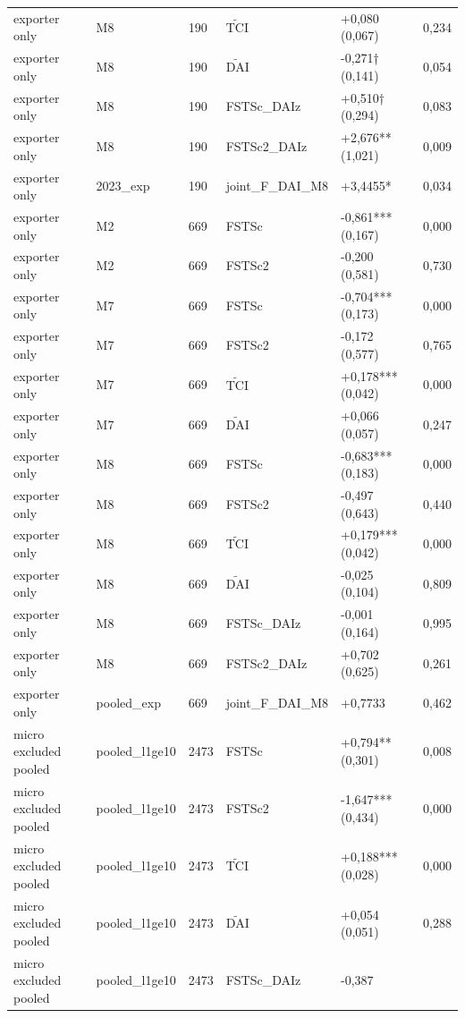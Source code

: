 \documentclass[12pt,a4paper]{article}
\begin{document}
\begin{longtable}[]{@{}llllll@{}}
exporter only & M8 & 190 & \(\tilde{\mathrm{TCI}}\) & +0,080 (0,067) &
0,234 \\
exporter only & M8 & 190 & \(\tilde{\mathrm{DAI}}\) & -0,271† (0,141) &
0,054 \\
exporter only & M8 & 190 & FSTSc\_DAIz & +0,510† (0,294) & 0,083 \\
exporter only & M8 & 190 & FSTSc2\_DAIz & +2,676** (1,021) & 0,009 \\
exporter only & 2023\_exp & 190 & joint\_F\_DAI\_M8 & +3,4455* &
0,034 \\
exporter only & M2 & 669 & FSTSc & -0,861*** (0,167) & 0,000 \\
exporter only & M2 & 669 & FSTSc2 & -0,200 (0,581) & 0,730 \\
exporter only & M7 & 669 & FSTSc & -0,704*** (0,173) & 0,000 \\
exporter only & M7 & 669 & FSTSc2 & -0,172 (0,577) & 0,765 \\
exporter only & M7 & 669 & \(\tilde{\mathrm{TCI}}\) & +0,178*** (0,042)
& 0,000 \\
exporter only & M7 & 669 & \(\tilde{\mathrm{DAI}}\) & +0,066 (0,057) &
0,247 \\
exporter only & M8 & 669 & FSTSc & -0,683*** (0,183) & 0,000 \\
exporter only & M8 & 669 & FSTSc2 & -0,497 (0,643) & 0,440 \\
exporter only & M8 & 669 & \(\tilde{\mathrm{TCI}}\) & +0,179*** (0,042)
& 0,000 \\
exporter only & M8 & 669 & \(\tilde{\mathrm{DAI}}\) & -0,025 (0,104) &
0,809 \\
exporter only & M8 & 669 & FSTSc\_DAIz & -0,001 (0,164) & 0,995 \\
exporter only & M8 & 669 & FSTSc2\_DAIz & +0,702 (0,625) & 0,261 \\
exporter only & pooled\_exp & 669 & joint\_F\_DAI\_M8 & +0,7733 &
0,462 \\
micro excluded pooled & pooled\_l1ge10 & 2473 & FSTSc & +0,794** (0,301)
& 0,008 \\
micro excluded pooled & pooled\_l1ge10 & 2473 & FSTSc2 & -1,647***
(0,434) & 0,000 \\
micro excluded pooled & pooled\_l1ge10 & 2473 & \(\tilde{\mathrm{TCI}}\)
& +0,188*** (0,028) & 0,000 \\
micro excluded pooled & pooled\_l1ge10 & 2473 & \(\tilde{\mathrm{DAI}}\)
& +0,054 (0,051) & 0,288 \\
micro excluded pooled & pooled\_l1ge10 & 2473 & FSTSc\_DAIz & -0,387

\end{longtable}
\end{document}

